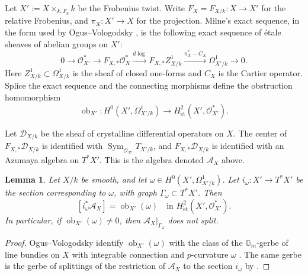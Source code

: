 \documentclass[11pt]{amsart}
\newtheorem{lemma}[theorem]{Lemma}
\newcommand{\DD}{\mathcal D}
\newcommand{\Gm}{\mathbb G_m}
\begin{document}
 Let
\(
X' := X\times_{k,F_k} k
\)
be the Frobenius twist.
Write \(F_X=F_{X/k}\colon X\to X'\) for the relative
Frobenius, and \(\pi_X\colon X'\to X\) for the projection.
Milne's exact sequence, in the form used by Ogus--Vologodsky
\cite[(4.1.1)]{OV}, is the following exact sequence of \'{e}tale sheaves of
abelian groups on \(X'\):
\begin{equation}\label{eq:milne}
0\longrightarrow \mathcal O_{X'}^*
\longrightarrow F_{X,*}\mathcal O_X^*
\xrightarrow{d\log}
F_{X,*}Z^1_{X/k}
\xrightarrow{\pi_X^*-C_X}
\Omega^1_{X'/k}
\longrightarrow 0.
\end{equation}
Here \(Z^1_{X/k}\subset \Omega^1_{X/k}\) is the sheaf of closed one-forms and
\(C_X\) is the Cartier operator.  Splice the exact sequence and the connecting morphisms define the obstruction homomorphism
\begin{equation}\label{eq:obstruction}
\operatorname{ob}_{X'}\colon
H^0(X',\Omega^1_{X'/k})
\to
H^2_{\mathrm{\acute et}}(X',\mathcal O_{X'}^*).
\end{equation}



Let $\DD_{X/k}$ be the sheaf of crystalline differential operators on $X$.
 The center
of \(F_{X,*}\DD_{X/k}\) is identified with
\(\operatorname{Sym}_{\mathcal O_{X'}}T_{X'/k}\), and 
\(F_{X,*}\DD_{X/k}\) is identified with an Azumaya algebra on \(T^*X'\).  This is the algebra
denoted \(\mathcal A_X\) above.

\begin{lemma}\label{lem:graph}
Let \(X/k\) be smooth, and let
\(\omega\in H^0(X',\Omega^1_{X'/k})\).  Let
\(
i_\omega\colon X'\longrightarrow T^*X'
\)
be the section corresponding to \(\omega\), with graph
\(\Gamma_\omega\subset T^*X'\).  Then
\[
[i_\omega^*\mathcal A_X]
=\operatorname{ob}_{X'}(\omega)
\quad\text{in } H^2_{\mathrm{\acute et}}(X',\mathcal O_{X'}^*).
\]
In particular, if \(\operatorname{ob}_{X'}(\omega)\ne 0\), then
\(\mathcal A_X|_{\Gamma_\omega}\) does not split.
\end{lemma}

\begin{proof}
Ogus--Vologodsky identify \(\operatorname{ob}_{X'}(\omega)\) with the class of
the \(\Gm\)-gerbe of line bundles on \(X\) with integrable connection and
\(p\)-curvature \(\omega\) \cite[Proposition 4.2]{OV}.  The same gerbe is the gerbe of splittings of the restriction of
\(\mathcal A_X\) to the section \(i_\omega\) by \cite[Remark 4.3]{OV}.  
\end{proof}
\end{document}
